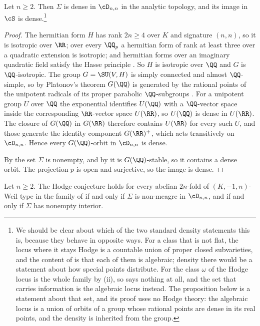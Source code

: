 \begin{proposition}\label{prop:densealg}
Let $n\ge2$. Then $\Sigma$ is dense in $\cD_{n,n}$ in the analytic topology,
and its image in $\cS$ is dense.\footnote{We should be clear about which
of the two standard density statements this is, because they behave in
opposite ways. For a class that is not flat, the locus where it stays Hodge is
a countable union of proper closed subvarieties, and the content of
 is that each of them is algebraic; density there would be a
statement about how special points distribute. For the class $\omega$ of
 the Hodge locus is the whole family by
(ii), so  says nothing at all, and the set
that carries information is the algebraic locus instead. The proposition below
is a statement about that set, and its proof uses no Hodge theory: the
algebraic locus is a union of orbits of a group whose rational points are
dense in its real points, and the density is inherited from the group.}
\end{proposition}

\begin{proof}
The hermitian form $H$ has rank $2n\ge4$ over $K$ and signature $(n,n)$, so it
is isotropic over $\RR$; over every $\QQ_{p}$ a hermitian form of rank at
least three over a quadratic extension is isotropic; and hermitian forms over
an imaginary quadratic field satisfy the Hasse principle
\cite[Ch.~10, \S 6]{Sch85}. So $H$ is isotropic over $\QQ$ and $G$ is
$\QQ$-isotropic. The group $G=\SU(V,H)$ is simply connected and almost
$\QQ$-simple, so by Platonov's theorem $G(\QQ)$ is generated by the rational
points of the unipotent radicals of its proper parabolic $\QQ$-subgroups
\cite[Thm.~7.6 and \S 7.2]{PR94}. For a unipotent group $U$ over $\QQ$ the
exponential identifies $U(\QQ)$ with a $\QQ$-vector space inside the
corresponding $\RR$-vector space $U(\RR)$, so $U(\QQ)$ is dense in $U(\RR)$.
The closure of $G(\QQ)$ in $G(\RR)$ therefore contains $U(\RR)$ for every such
$U$, and those generate the identity component $G(\RR)^{+}$, which acts
transitively on $\cD_{n,n}$. Hence every $G(\QQ)$-orbit in $\cD_{n,n}$ is
dense.

By  the set $\Sigma$ is nonempty, and by
 it is $G(\QQ)$-stable, so it contains a dense orbit.
The projection $p$ is open and surjective, so the image is dense.
\end{proof}

\begin{corollary}\label{cor:meagre}
Let $n\ge2$. The Hodge conjecture holds for every abelian $2n$-fold of
$(K,-1,n)$-Weil type in the family of  if and only if
$\Sigma$ is non-meagre in $\cD_{n,n}$, and if and only if $\Sigma$ has
nonempty interior.
\end{corollary}

